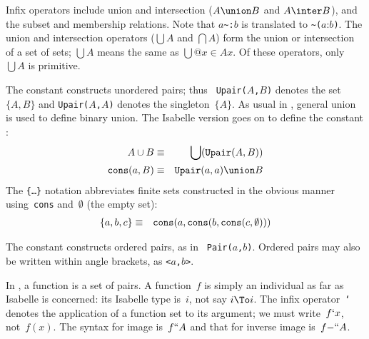 Infix operators include union and intersection ($A\union B$ and $A\inter
B$), and the subset and membership relations.  Note that $a$\verb|~:|$b$ is
translated to \verb|~(|$a$:$b$\verb|)|.  The union and intersection
operators ($\bigcup A$ and $\bigcap A$) form the union or intersection of a
set of sets; $\bigcup A$ means the same as $\bigcup@{x\in A}x$.  Of these
operators, only $\bigcup A$ is primitive.

The constant  constructs unordered pairs; thus {\tt
Upair($A$,$B$)} denotes the set~$\{A,B\}$ and {\tt Upair($A$,$A$)} denotes
the singleton~$\{A\}$.  As usual in {\ZF}, general union is used to define
binary union.  The Isabelle version goes on to define the constant
:
\begin{eqnarray*}
   A\cup B  		& \equiv &	 \bigcup({\tt Upair}(A,B)) \\
   {\tt cons}(a,B) 	& \equiv &	  {\tt Upair}(a,a) \union B
\end{eqnarray*}
The {\tt\{\ldots\}} notation abbreviates finite sets constructed in the
obvious manner using~{\tt cons} and~$\emptyset$ (the empty set):
\begin{eqnarray*}
 \{a,b,c\} & \equiv & {\tt cons}(a,{\tt cons}(b,{\tt cons}(c,\emptyset)))
\end{eqnarray*}

The constant  constructs ordered pairs, as in {\tt
Pair($a$,$b$)}.  Ordered pairs may also be written within angle brackets,
as {\tt<$a$,$b$>}.

In {\ZF}, a function is a set of pairs.  A {\ZF} function~$f$ is simply an
individual as far as Isabelle is concerned: its Isabelle type is~$i$, not
say $i\To i$.  The infix operator~{\tt`} denotes the application of a
function set to its argument; we must write~$f{\tt`}x$, not~$f(x)$.  The
syntax for image is~$f{\tt``}A$ and that for inverse image is~$f{\tt-``}A$.



